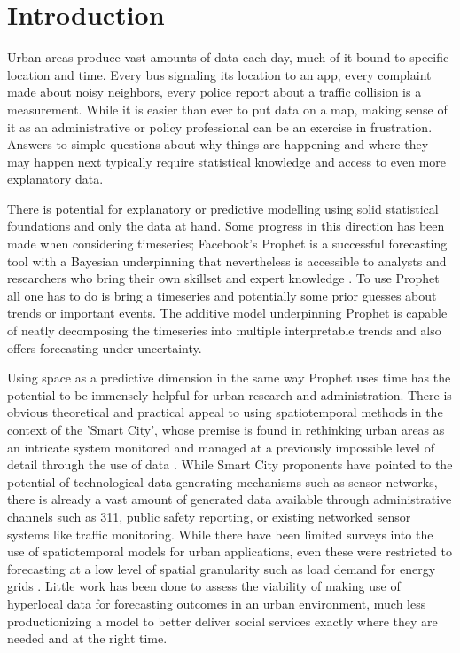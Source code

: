 \chapter{Introduction}
\label{introduction}

Urban areas produce vast amounts of data each day, much of it bound to specific location and time. Every bus signaling its location to an app, every complaint made about noisy neighbors, every police report about a traffic collision is a measurement. While it is easier than ever to put data on a map, making sense of it as an administrative or policy professional can be an exercise in frustration. Answers to simple questions about why things are happening and where they may happen next typically require statistical knowledge and access to even more explanatory data. \par

There is potential for explanatory or predictive modelling using solid statistical foundations and only the data at hand. Some progress in this direction has been made when considering timeseries; Facebook's Prophet is a successful forecasting tool with a Bayesian underpinning that nevertheless is accessible to analysts and researchers who bring their own skillset and expert knowledge \cite{prophet}. To use Prophet all one has to do is bring a timeseries and potentially some prior guesses about trends or important events. The additive model underpinning Prophet is capable of neatly decomposing the timeseries into multiple interpretable trends and also offers forecasting under uncertainty. \par

Using space as a predictive dimension in the same way Prophet uses time has the potential to be immensely helpful for urban research and administration. There is obvious theoretical and practical appeal to using spatiotemporal methods in the context of the 'Smart City', whose premise is found in rethinking urban areas as an intricate system monitored and managed at a previously impossible level of detail through the use of data \cite{kitchin_2014}. While Smart City proponents have pointed to the potential of technological data generating mechanisms such as sensor networks, there is already a vast amount of generated data available through administrative channels such as 311, public safety reporting, or existing networked sensor systems like traffic monitoring. While there have been limited surveys into the use of spatiotemporal models for urban applications, even these were restricted to forecasting at a low level of spatial granularity such as load demand for energy grids \cite{tascikaraoglu_2017}. Little work has been done to assess the viability of making use of hyperlocal data for forecasting outcomes in an urban environment, much less productionizing a model to better deliver social services exactly where they are needed and at the right time.
